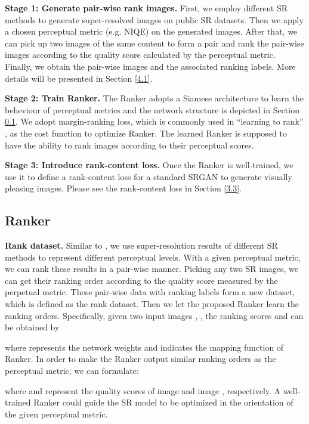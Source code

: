 \documentclass[10pt,twocolumn,letterpaper]{article}
\begin{document}
\textbf{Stage 1: Generate pair-wise rank images.} First, we employ different SR methods to generate super-resolved images on public SR datasets. Then we apply a chosen perceptual metric (e.g. NIQE) on the generated images. After that, we can pick up two images of the same content to form a pair and rank the pair-wise images according to the quality score calculated by the perceptual metric. Finally, we obtain the pair-wise images and the associated ranking labels. More details will be presented in Section \ref{4.1}.

\textbf{Stage 2: Train Ranker.} The Ranker adopts a Siamese architecture to learn the beheviour of perceptual metrics and the network structure is depicted in Section \ref{section:3.2}. We adopt margin-ranking loss, which is commonly used in ``learning to rank'' \cite{burges2005learning}, as the cost function to optimize Ranker. The learned Ranker is supposed to have the ability to rank images according to their perceptual scores.

\textbf{Stage 3: Introduce rank-content loss.} Once the Ranker is well-trained, we use it to define a rank-content loss for a standard SRGAN to generate visually pleasing images. Please see the rank-content loss in Section \ref{3.3}.

\subsection{Ranker}
\label{section:3.2}
\textbf{Rank dataset.} Similar to \cite{choi2018deep,liu2017rankiqa}, we use super-resolution results of different SR methods to represent different perceptual levels.
With a given perceptual metric, we can rank these results in a pair-wise manner. Picking any two SR images, we can get their ranking order according to the quality score measured by the perpetual metric. These pair-wise data with ranking labels form a new dataset, which is defined as the rank dataset. Then we let the proposed Ranker learn the ranking orders. Specifically, given two input images , , the ranking scores  and  can be obtained by

\begin{small}


\end{small}where  represents the network weights and  indicates the mapping function of Ranker. In order to make the Ranker output similar ranking orders as the perceptual metric, we can formulate:
\begin{small}

\end{small}where  and  represent the quality scores of image  and image , respectively. A well-trained Ranker could guide the SR model to be optimized in the orientation of the given perceptual metric.
\end{document}
